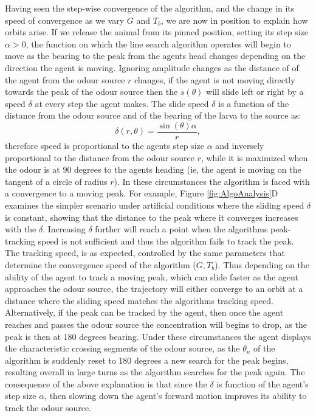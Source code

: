 \documentclass[10pt,a4paper]{article}
\begin{document}
 
Having seen the step-wise convergence of the algorithm, and the change in its speed of convergence as we vary $G$ and $T_b$, we are now in position to explain how orbits arise. If we release the animal from its pinned position, setting its step size $\alpha > 0$, the function on which the line search algorithm operates will begin to move as the bearing to the peak from the agents head changes depending on the direction the agent is moving. Ignoring amplitude changes as the distance of of the agent from the odour source $r$ changes, if the agent is not moving directly towards the peak of the odour source then the $s(\theta)$ will slide left or right by a speed $\delta$ at every step the agent makes.
The slide speed $\delta$  is a function of the distance from the odour source and of the bearing of the larva to the source as:
\begin{equation}
\delta(r,\theta) = \frac{\sin(\theta)\alpha}{r},
\label{eq:driftSpeed}
\end{equation}
therefore speed is proportional to the agents step size $\alpha$ and inversely proportional to the distance from the odour source $r$, while it is maximized when the odour is at $90$ degrees to the agents heading (ie, the agent is moving on the tangent of a circle of radius $r$). In these circumstances the algorithm is faced with a convergence to a moving peak. For example, Figure \ref{fig:AlgoAnalysis}D examines the simpler scenario under artificial conditions where the sliding speed $\delta$ is constant, showing that the distance to the peak where it converges increases with the $\delta$. Increasing $\delta$ further will reach a point when the algorithms peak-tracking speed is not sufficient and thus the algorithm fails to track the peak. The tracking speed, is as expected, controlled by the same parameters that determine the convergence speed of the algorithm ($G, T_b$). 
Thus depending on the ability of the agent to track a moving peak, which can slide faster as the agent approaches the odour source, the trajectory will either converge to an orbit at a distance where the sliding speed matches the algorithms tracking speed. Alternatively, if the peak can be tracked by the agent,  then once the agent reaches and passes the odour source the concentration will begins to drop, as the peak is then at 180 degrees bearing. Under these circumstances the agent displays the characteristic crossing segments of the odour source, as the $\theta_n$ of the algorithm is suddenly reset to 180 degrees a new search for the peak begins, resulting overall in large turns as the algorithm searches for the peak again.
The consequence of the above explanation is that since the $\delta$ is function of the agent's step size $\alpha$, then slowing down the agent's forward motion improves its ability to track the odour source. 
\end{document}
